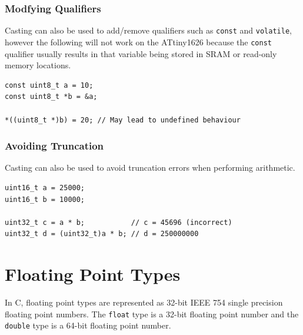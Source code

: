 \documentclass{report}
\begin{document}
\subsubsection{Modfying Qualifiers}
Casting can also be used to add/remove qualifiers such as \texttt{const} and \texttt{volatile},
however the following will not work on the ATtiny1626 because the \texttt{const} qualifier
usually results in that variable being stored in SRAM or read-only memory locations.
\begin{verbatim}
const uint8_t a = 10;
const uint8_t *b = &a;

*((uint8_t *)b) = 20; // May lead to undefined behaviour
\end{verbatim}
\subsubsection{Avoiding Truncation}
Casting can also be used to avoid truncation errors when performing arithmetic.
\begin{verbatim}
uint16_t a = 25000;
uint16_t b = 10000;

uint32_t c = a * b;           // c = 45696 (incorrect)
uint32_t d = (uint32_t)a * b; // d = 250000000
\end{verbatim}
\section{Floating Point Types}
In C, floating point types are represented as 32-bit IEEE 754 single precision
floating point numbers. The \texttt{float} type is a 32-bit floating point number and
the \texttt{double} type is a 64-bit floating point number.
\end{document}

